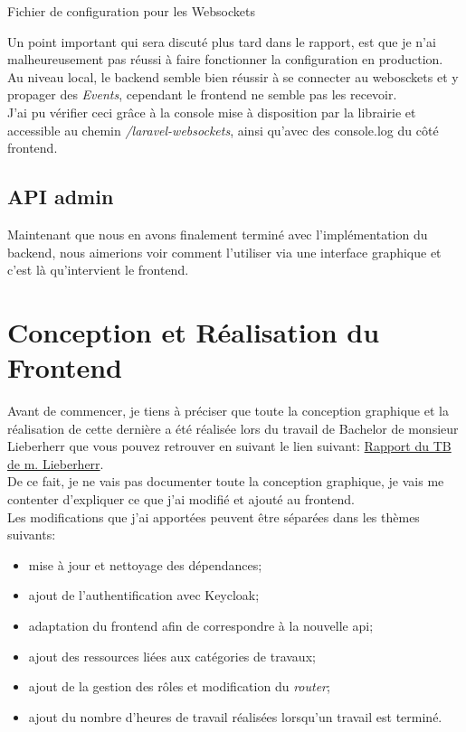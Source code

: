 \documentclass[
    iai, %
    il, %
]{heig-tb}
\begin{document}
\begin{listing}[h]
    \inputminted{php}{assets/code/websockets.php}
    \caption{Fichier de configuration pour les Websockets \label{ws-websockets}}
\end{listing}

Un point important qui sera discuté plus tard dans le rapport, est que je n'ai malheureusement pas réussi à faire fonctionner la configuration en production. \\
Au niveau local, le  \Gls{backend} semble bien réussir à se connecter au webosckets et y propager des \emph{Events}, cependant le \Gls{frontend} ne semble pas les recevoir. \\
J'ai pu vérifier ceci grâce à la console mise à disposition par la librairie et accessible au chemin \emph{/laravel-websockets}, ainsi qu'avec des console.log du côté \Gls{frontend}.


\section{API admin}

Maintenant que nous en avons finalement terminé avec l'implémentation du \Gls{backend}, nous aimerions voir comment l'utiliser via une interface graphique et c'est là qu'intervient le \Gls{frontend}.

\chapter{Conception et Réalisation du Frontend}
Avant de commencer, je tiens à préciser que toute la conception graphique et la réalisation de cette dernière a été réalisée lors du travail de Bachelor de monsieur Lieberherr que vous pouvez retrouver en suivant le lien suivant: \href{https://tb.heig-vd.ch/7532}{Rapport du TB de m. Lieberherr}. \\
De ce fait, je ne vais pas documenter toute la conception graphique, je vais me contenter d'expliquer ce que j'ai modifié et ajouté au \Gls{frontend}. \\
Les modifications que j'ai apportées peuvent être séparées dans les thèmes suivants:
\begin{itemize}
    \item mise à jour et nettoyage des dépendances;
    \item ajout de l'authentification avec Keycloak;
    \item adaptation du \Gls{frontend} afin de correspondre à la nouvelle \Gls{api};
    \item ajout des ressources liées aux catégories de travaux;
    \item ajout de la gestion des rôles et modification du \emph{router};
    \item ajout du nombre d'heures de travail réalisées lorsqu'un travail est terminé.
\end{itemize}
\end{document}
